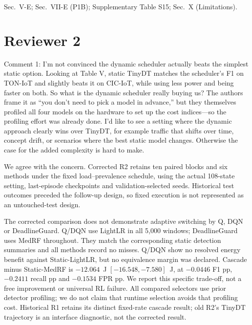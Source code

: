 \documentclass[10pt,a4paper]{article}
\begin{document}
\begin{wherebox}
Sec.~V-E; Sec.~VII-E (P1B); Supplementary Table S15; Sec.~X (Limitations).
\end{wherebox}

\section*{Reviewer 2}

\begin{rcommentbox}
Comment 1: I'm not convinced the dynamic scheduler actually beats the simplest static option. Looking at Table V, static TinyDT matches the scheduler's F1 on TON-IoT and slightly beats it on CIC-IoT, while using less power and being faster on both. So what is the dynamic scheduler really buying us? The authors frame it as ``you don't need to pick a model in advance,'' but they themselves profiled all four models on the hardware to set up the cost indices---so the profiling effort was already done. I'd like to see a setting where the dynamic approach clearly wins over TinyDT, for example traffic that shifts over time, concept drift, or scenarios where the best static model changes. Otherwise the case for the added complexity is hard to make.
\end{rcommentbox}

\begin{authorresponsebox}
We agree with the concern. Corrected R2 retains ten paired blocks and six methods under the fixed load--prevalence schedule, using the actual 108-state setting, last-episode checkpoints and validation-selected seeds. Historical test outcomes preceded the follow-up design, so fixed execution is not represented as an untouched-test design.

The corrected comparison does not demonstrate adaptive switching by Q, DQN or DeadlineGuard. Q/DQN use LightLR in all 5{,}000 windows; DeadlineGuard uses MedRF throughout. They match the corresponding static detection summaries and all methods record no misses. Q/DQN show no resolved energy benefit against Static-LightLR, but no equivalence margin was declared. Cascade minus Static-MedRF is $-12.064$~J $[-16.548,-7.580]$~J, at $-0.0446$ F1 pp, $-0.2411$ recall pp and $-0.1534$ FPR pp. We report this specific trade-off, not a free improvement or universal RL failure. All compared selectors use prior detector profiling; we do not claim that runtime selection avoids that profiling cost. Historical R1 retains its distinct fixed-rate cascade result; old R2's TinyDT trajectory is an interface diagnostic, not the corrected result.
\end{authorresponsebox}
\end{document}
